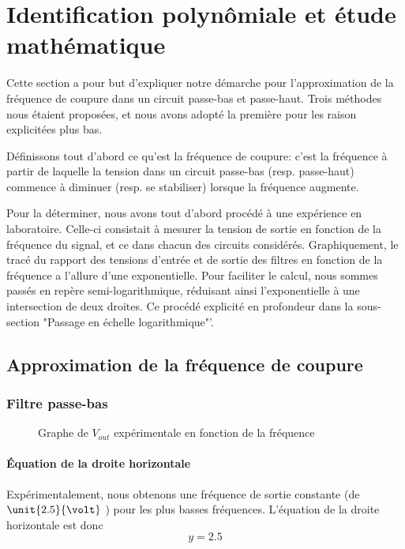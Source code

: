 
\section{Identification polynômiale et étude mathématique}

Cette section a pour but d'expliquer notre démarche pour l'approximation de la fréquence de coupure
dans un circuit passe-bas et passe-haut. Trois méthodes nous étaient proposées, et nous avons adopté 
la première pour les raison explicitées plus bas.

Définissons tout d'abord ce qu'est la fréquence de coupure: c'est la fréquence à partir de laquelle 
la tension dans un circuit passe-bas (resp. passe-haut) commence à diminuer (resp. se stabiliser) 
lorsque la fréquence augmente.

Pour la déterminer, nous avons tout d'abord procédé à une expérience en laboratoire.
Celle-ci consistait à mesurer la tension de sortie en fonction de la fréquence du signal, et ce dans 
chacun des circuits considérés.
Graphiquement, le tracé du rapport des tensions d'entrée et de sortie des filtres en fonction de la 
fréquence a l'allure d'une exponentielle.  Pour faciliter le calcul, nous sommes passés en repère 
semi-logarithmique, réduisant ainsi l'exponentielle à une intersection de deux droites. Ce procédé
explicité en profondeur dans la sous-section "Passage en échelle logarithmique"'.

\subsection{Approximation de la fréquence de coupure}

\subsubsection{Filtre passe-bas}

\begin{figure}[ht!]
\centering
{}
\caption{Graphe de $V_{out}$ expérimentale en fonction de la fréquence}
\label{lwp_ratio}
\end{figure}


\paragraph{Équation de la droite horizontale}
Expérimentalement, nous obtenons une fréquence de sortie constante (de $\unit{2.5}{\volt}$ ) 
pour les plus basses fréquences. L'équation de la droite horizontale est donc \[y=2.5\]


